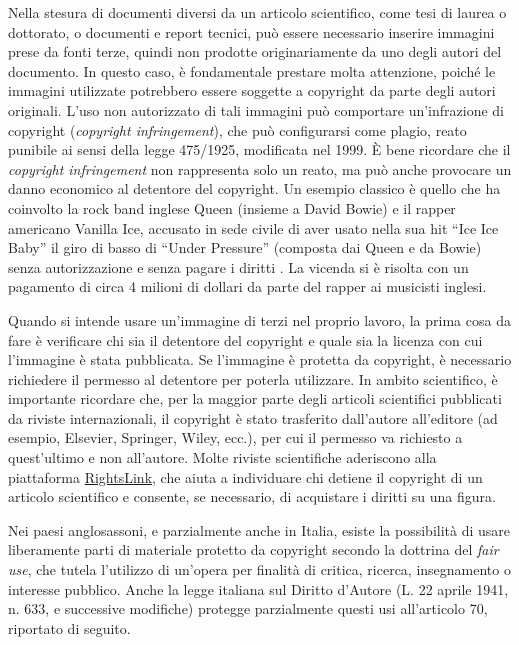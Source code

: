 \documentclass[9pt,a4paper,twoside]{rho-class/rho}
\begin{document}
Nella stesura di documenti diversi da un articolo scientifico, come tesi di laurea o dottorato, o documenti e report tecnici, può essere necessario inserire immagini prese da fonti terze, quindi non prodotte originariamente da uno degli autori del documento. In questo caso, è fondamentale prestare molta attenzione, poiché le immagini utilizzate potrebbero essere soggette a copyright da parte degli autori originali. L’uso non autorizzato di tali immagini può comportare un’infrazione di copyright (\textit{copyright infringement}), che può configurarsi come plagio, reato punibile ai sensi della legge 475/1925, modificata nel 1999. È bene ricordare che il \textit{copyright infringement} non rappresenta solo un reato, ma può anche provocare un danno economico al detentore del copyright. Un esempio classico è quello che ha coinvolto la rock band inglese Queen (insieme a David Bowie) e il rapper americano Vanilla Ice, accusato in sede civile di aver usato nella sua hit “Ice Ice Baby” il giro di basso di “Under Pressure” (composta dai Queen e da Bowie) senza autorizzazione e senza pagare i diritti \parencite{plagioQueen}. La vicenda si è risolta con un pagamento di circa 4 milioni di dollari da parte del rapper ai musicisti inglesi.

Quando si intende usare un’immagine di terzi nel proprio lavoro, la prima cosa da fare è verificare chi sia il detentore del copyright e quale sia la licenza con cui l’immagine è stata pubblicata. Se l’immagine è protetta da copyright, è necessario richiedere il permesso al detentore per poterla utilizzare. In ambito scientifico, è importante ricordare che, per la maggior parte degli articoli scientifici pubblicati da riviste internazionali, il copyright è stato trasferito dall’autore all’editore (ad esempio, Elsevier, Springer, Wiley, ecc.), per cui il permesso va richiesto a quest’ultimo e non all’autore. Molte riviste scientifiche aderiscono alla piattaforma \href{https://www.copyright.com/solutions-rightslink-scientific-communications/}{RightsLink}, che aiuta a individuare chi detiene il copyright di un articolo scientifico e consente, se necessario, di acquistare i diritti su una figura.

Nei paesi anglosassoni, e parzialmente anche in Italia, esiste la possibilità di usare liberamente parti di materiale protetto da copyright secondo la dottrina del \textit{fair use}, che tutela l’utilizzo di un’opera per finalità di critica, ricerca, insegnamento o interesse pubblico. Anche la legge italiana sul Diritto d’Autore (L. 22 aprile 1941, n. 633, e successive modifiche) protegge parzialmente questi usi all’articolo 70, riportato di seguito.
\end{document}
